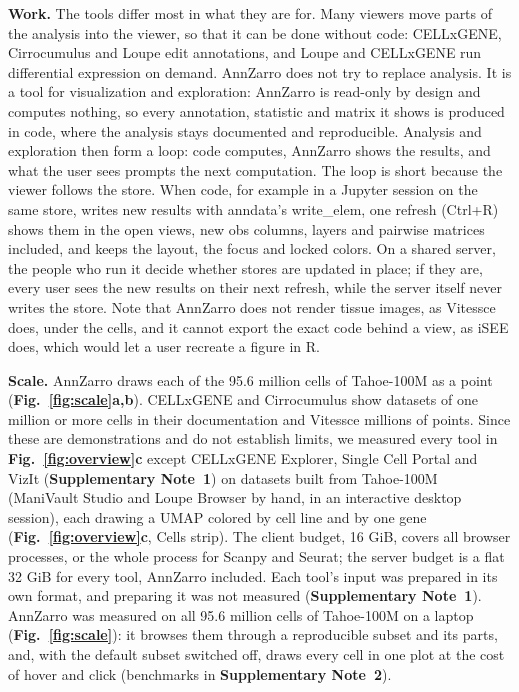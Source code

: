 \textbf{Work.} The tools differ most in what they are for. Many viewers move parts of the analysis into the viewer, so that it can be done without code: CELLxGENE, Cirrocumulus and Loupe edit annotations, and Loupe and CELLxGENE run differential expression on demand. AnnZarro does not try to replace analysis. It is a tool for visualization and exploration: AnnZarro is read-only by design and computes nothing, so every annotation, statistic and matrix it shows is produced in code, where the analysis stays documented and reproducible. Analysis and exploration then form a loop: code computes, AnnZarro shows the results, and what the user sees prompts the next computation. The loop is short because the viewer follows the store. When code, for example in a Jupyter session on the same store, writes new results with anndata's write\_elem, one refresh (Ctrl+R) shows them in the open views, new obs columns, layers and pairwise matrices included, and keeps the layout, the focus and locked colors. On a shared server, the people who run it decide whether stores are updated in place; if they are, every user sees the new results on their next refresh, while the server itself never writes the store. Note that AnnZarro does not render tissue images, as Vitessce does, under the cells, and it cannot export the exact code behind a view, as iSEE does, which would let a user recreate a figure in R. 

\textbf{Scale.} AnnZarro draws each of the 95.6 million cells of Tahoe-100M as a point (\textbf{Fig.~\ref{fig:scale}a,b}). CELLxGENE and Cirrocumulus show datasets of one million or more cells in their documentation and Vitessce millions of points. Since these are demonstrations and do not establish limits, we measured every tool in \textbf{Fig.~\ref{fig:overview}c} except CELLxGENE Explorer, Single Cell Portal and VizIt (\textbf{Supplementary Note~1}) on datasets built from Tahoe-100M (ManiVault Studio and Loupe Browser by hand, in an interactive desktop session), each drawing a UMAP colored by cell line and by one gene (\textbf{Fig.~\ref{fig:overview}c}, Cells strip). The client budget, 16 GiB, covers all browser processes, or the whole process for Scanpy and Seurat; the server budget is a flat 32 GiB for every tool, AnnZarro included. Each tool's input was prepared in its own format, and preparing it was not measured (\textbf{Supplementary Note~1}). AnnZarro was measured on all 95.6 million cells of Tahoe-100M on a laptop (\textbf{Fig.~\ref{fig:scale}}): it browses them through a reproducible subset and its parts, and, with the default subset switched off, draws every cell in one plot at the cost of hover and click (benchmarks in \textbf{Supplementary Note~2}).

